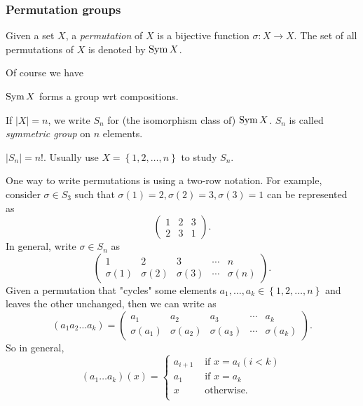 \documentclass[a4paper]{article}
\begin{document}
    \subsubsection{Permutation groups}
    \begin{definition}
        Given a set $X$, a \textit{permutation} of $X$ is a bijective function $ \sigma:X\to X $. The set of all permutations of $X$ is denoted by $ \operatorname{Sym} X $.
    \end{definition}
    Of course we have 
    \begin{theorem}\label{thm:perm_group}
        $ \operatorname{Sym} X $ forms a group wrt compositions.
    \end{theorem}
    \begin{definition}
        If $ |X|=n $, we write $ S_n $ for (the isomorphism class of) $ \operatorname{Sym} X $. $S_n$ is called \textit{symmetric group} on $n$ elements.
    \end{definition}
    \begin{remark}
        $ |S_n|=n! $. Usually use $ X=\left\{ 1,2,\dots,n\right\} $ to study $S_n$.
    \end{remark}
    One way to write permutations is using a two-row notation. For example, consider $ \sigma\in S_3 $ such that $ \sigma(1)=2, \sigma(2)=3, \sigma(3)=1 $ can be represented as
    \[
        \begin{pmatrix}
            1&2&3\\
            2&3&1
        \end{pmatrix}
    .\]
    In general, write $ \sigma\in S_n $ as 
    \[
        \begin{pmatrix}
            1&2&3&\cdots&n\\
            \sigma(1)&\sigma(2)&\sigma(3)&\cdots&\sigma(n)
        \end{pmatrix}
    .\]
    Given a permutation that "cycles" some elements $ a_1,\dots,a_k \in \left\{ 1,2,\dots,n\right\}$ and leaves the other unchanged, then we can write as
    \[
        (a_1 a_2 \dots a_k) = \begin{pmatrix}
            a_1&a_2&a_3&\cdots&a_k\\
            \sigma(a_1)&\sigma(a_2)&\sigma(a_3)&\cdots&\sigma(a_k)
        \end{pmatrix}
    .\]
    So in general,
    \[
        (a_1 \dots a_k)(x) =\begin{cases}
        a_{i+1} &\text{ if } x=a_i(i<k)\\
        a_1 &\text{ if } x=a_k\\
        x &\text{ otherwise.}\\
        \end{cases} 
    \]
\end{document}
